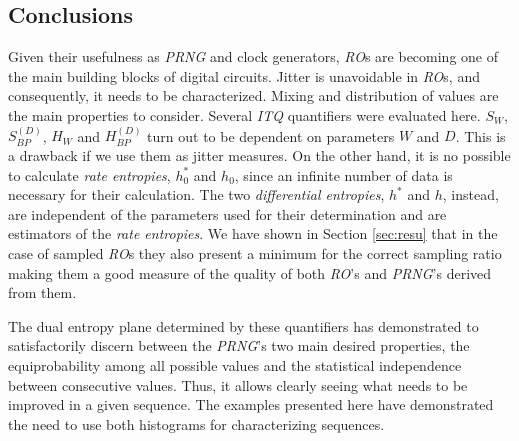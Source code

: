 \subsection{Conclusions}
\label{sec:conclu}
Given their usefulness as \emph{PRNG} and clock generators, \emph{RO}s are becoming one of the main building blocks of digital circuits. Jitter is unavoidable in \emph{RO}s, and consequently, it needs to be characterized. Mixing and distribution of values are the main properties to consider. 
Several \emph{ITQ} quantifiers were evaluated here. $S_W$, $S^{(D)}_{BP}$, $H_W$ and $H^{(D)}_{BP}$ turn out to be dependent on parameters $W$ and $D$. This is a drawback if we use them as jitter measures. On the other hand, it is no possible to calculate  \emph{rate entropies}, $h_0^*$ and $h_0$,  since an infinite number of data is necessary for their calculation. The two \emph{differential entropies}, $h^*$ and $h$, instead, are independent of the parameters used for their determination and are estimators of the \emph{rate entropies}. We have shown in Section \ref{sec:resu} that in the case of sampled \emph{RO}s they also present a minimum for the correct sampling ratio making them a good measure of the quality of both \emph{RO}'s and \emph{PRNG}'s derived from them. 

The dual entropy plane determined by these quantifiers has demonstrated to satisfactorily discern between the \emph{PRNG}'s two main desired properties, the equiprobability among all possible values and the statistical independence between consecutive values. Thus, it allows clearly seeing what needs to be improved in a given sequence.
The examples presented here have demonstrated the need to use both histograms for characterizing sequences.

%


